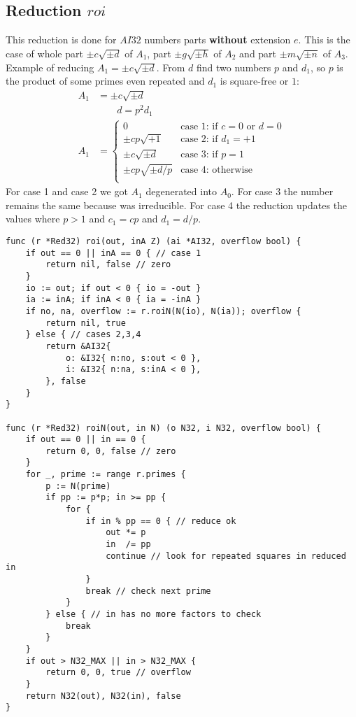 \documentclass{article}
\begin{document}
\subsection{Reduction $roi$}
This reduction is done for $AI32$ numbers parts \textbf{without} extension $e$. This is the case of whole part $\pm c\sqrt{\pm d}$ of $A_1$,
part $\pm g\sqrt{\pm h}$ of $A_2$ and
part $\pm m\sqrt{\pm n}$ of $A_3$.
Example of reducing $A_1 = \pm c\sqrt{\pm d}$.
From $d$ find two numbers $p$ and $d_1$, so $p$ is the product of some primes even repeated
and $d_1$ is square-free or $1$:
\begin{align}
A_1 &= \pm c\sqrt{\pm d}\\
 &\qquad \boxed{ d = p^2d_1 }\\
A_1 &= \begin{cases}
 0                    &\text{case 1: if } c = 0 \text{ or } d = 0\\
 \pm cp\sqrt{+1}      &\text{case 2: if } d_1 = +1\\
 \pm c\sqrt{\pm d}    &\text{case 3: if } p = 1\\
 \pm cp\sqrt{\pm d/p} &\text{case 4: otherwise }\\
\end{cases}
\end{align}
For case 1 and case 2 we got $A_1$ degenerated into $A_0$.
For case 3 the number remains the same because was irreducible. For case 4 the reduction
updates the values where $p > 1$ and $c_1=cp$ and $d_1 = d/p$.
\begin{lstlisting}
func (r *Red32) roi(out, inA Z) (ai *AI32, overflow bool) {
	if out == 0 || inA == 0 { // case 1
		return nil, false // zero
	}
	io := out; if out < 0 { io = -out }
	ia := inA; if inA < 0 { ia = -inA }
	if no, na, overflow := r.roiN(N(io), N(ia)); overflow {
		return nil, true
	} else { // cases 2,3,4
		return &AI32{
			o: &I32{ n:no, s:out < 0 },
			i: &I32{ n:na, s:inA < 0 },
		}, false
	}
}

func (r *Red32) roiN(out, in N) (o N32, i N32, overflow bool) {
	if out == 0 || in == 0 {
		return 0, 0, false // zero
	}
	for _, prime := range r.primes {
		p := N(prime)
		if pp := p*p; in >= pp {
			for {
				if in % pp == 0 { // reduce ok
					out *= p
					in  /= pp
					continue // look for repeated squares in reduced in
				}
				break // check next prime
			}
		} else { // in has no more factors to check
			break
		}
	}
	if out > N32_MAX || in > N32_MAX {
		return 0, 0, true // overflow
	}
	return N32(out), N32(in), false
}
\end{lstlisting}
\end{document}
